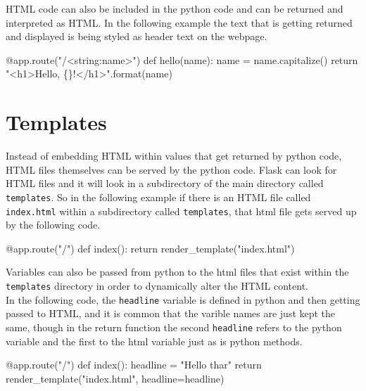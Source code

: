 \documentclass[]{book}
\newenvironment{Shaded}{\begin{snugshade}}{\end{snugshade}}
\newcommand{\StringTok}[1]{\textcolor[rgb]{0.31,0.60,0.02}{#1}}
\newcommand{\BuiltInTok}[1]{#1}
\newcommand{\ExtensionTok}[1]{#1}
\newcommand{\NormalTok}[1]{#1}
\begin{document}
HTML code can also be included in the python code and can be returned
and interpreted as HTML. In the following example the text that is
getting returned and displayed is being styled as header text on the
webpage.

\begin{Shaded}
\begin{Highlighting}[]
\ExtensionTok{@app.route}\NormalTok{(}\StringTok{"/<string:name>"}\NormalTok{)}
\ExtensionTok{def}\NormalTok{ hello(name)}\BuiltInTok{:}
    \ExtensionTok{name}\NormalTok{ = name.capitalize()}
    \BuiltInTok{return} \StringTok{"<h1>Hello, \{\}!</h1>"}\NormalTok{.format(name)}
\end{Highlighting}
\end{Shaded}

\section{Templates}\label{templates}

Instead of embedding HTML within values that get returned by python
code, HTML files themselves can be served by the python code. Flask can
look for HTML files and it will look in a subdirectory of the main
directory called \texttt{templates}. So in the following example if
there is an HTML file called \texttt{index.html} within a subdirectory
called \texttt{templates}, that html file gets served up by the
following code.

\begin{Shaded}
\begin{Highlighting}[]
\ExtensionTok{@app.route}\NormalTok{(}\StringTok{"/"}\NormalTok{)}
\ExtensionTok{def}\NormalTok{ index()}\BuiltInTok{:}
    \BuiltInTok{return}\NormalTok{ render_template(}\StringTok{"index.html"}\NormalTok{)}
\end{Highlighting}
\end{Shaded}

Variables can also be passed from python to the html files that exist
within the \texttt{templates} directory in order to dynamically alter
the HTML content.\\
In the following code, the \texttt{headline} variable is defined in
python and then getting passed to HTML, and it is common that the
varible names are just kept the same, though in the return function the
second \texttt{headline} refers to the python variable and the first to
the html variable just as is python methods.

\begin{Shaded}
\begin{Highlighting}[]
\ExtensionTok{@app.route}\NormalTok{(}\StringTok{"/"}\NormalTok{)}
\ExtensionTok{def}\NormalTok{ index()}\BuiltInTok{:}
    \ExtensionTok{headline}\NormalTok{ = }\StringTok{"Hello thar"}
    \BuiltInTok{return}\NormalTok{ render_template(}\StringTok{"index.html"}\NormalTok{, headline=headline)}
\end{Highlighting}
\end{Shaded}
\end{document}
